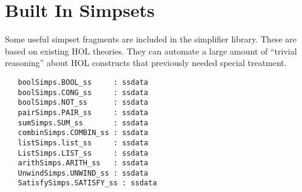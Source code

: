 \documentclass[a4]{article}
\begin{document}
\section{Built In Simpsets}


Some useful simpset fragments are included in the simplifier library.
These are based on existing HOL theories.  They can automate a large
amount of ``trivial reasoning'' about HOL constructs that previously
needed special treatment.
\begin{boxed}
\begin{verbatim}
   boolSimps.BOOL_ss     : ssdata
   boolSimps.CONG_ss     : ssdata
   boolSimps.NOT_ss      : ssdata
   pairSimps.PAIR_ss     : ssdata
   sumSimps.SUM_ss       : ssdata
   combinSimps.COMBIN_ss : ssdata
   listSimps.list_ss     : ssdata
   ListSimps.LIST_ss     : ssdata
   arithSimps.ARITH_ss   : ssdata
   UnwindSimps.UNWIND_ss : ssdata
   SatisfySimps.SATISFY_ss : ssdata
\end{verbatim}
\end{boxed}
\end{document}
